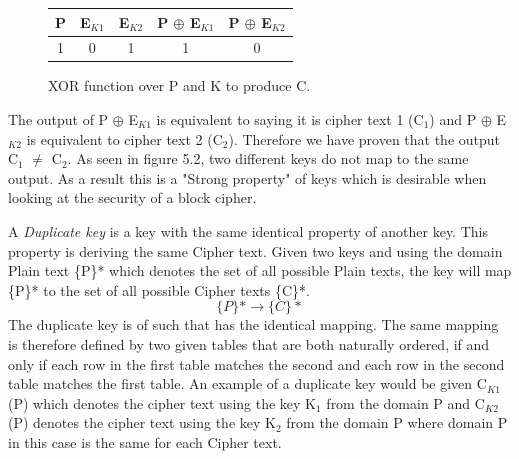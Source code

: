 \documentclass[11pt,a4paper, notitlepage]{report}
\begin{document}
\begin{figure}[H]
\centering
\label{tab:XOR function}
\begin{tabular}{|c|c|c|c|c|}
\hline
P & E$_{K1}$ & E$_{K2}$ & P $\oplus$ E$_{K1}$ & P $\oplus$ E$_{K2}$\\ \hline
1 & 0 & 1 & 1 & 0 \\
\hline
\end{tabular}
\caption{XOR function over P and K to produce C.}
\end{figure}

The output of P $\oplus$ E$_{K1}$ is equivalent to saying it is cipher text 1 (C$_1$) and P $\oplus$ E$_{K2}$ is equivalent to cipher text 2 (C$_2$). Therefore we have proven that the output C$_1$ $\neq$ C$_2$.
As seen in figure 5.2, two different keys do not map to the same output. As a result this is a "Strong property" of keys which is desirable when looking at the security of a block cipher.

A \emph{Duplicate key} is a key with the same identical property of another key. This property is deriving the same Cipher text. Given two keys and using the domain Plain text \{P\}* which denotes the set of all possible Plain texts, the key will map \{P\}* to the set of all possible Cipher texts \{C\}*.
\begin{displaymath}
\{P\}* \rightarrow \{C\}*
\end{displaymath}
The duplicate key is of such that has the identical mapping. The same mapping is therefore defined by two given tables that are both naturally ordered, if and only if each row in the first table matches the second and each row in the second table matches the first table.
An example of a duplicate key would be given C$_{K1}$(P) which denotes the cipher text using the key K$_1$ from the domain P and C$_{K2}$(P) denotes the cipher text using the key K$_2$ from the domain P where domain P in this case is the same for each Cipher text.
\end{document}
